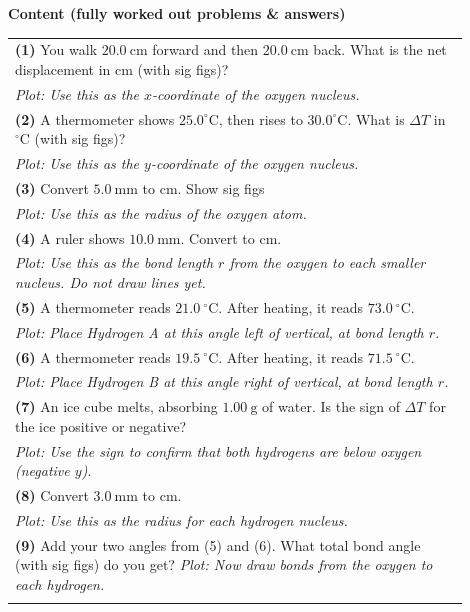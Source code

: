 \documentclass{article}
\begin{document}
\noindent
{\large \textbf{Content (fully worked out problems \& answers)}}
\\
\begin{tabular}{|p{0.9\linewidth}|}
\hline
\textbf{(1)} You walk $20.0~\text{cm}$ forward and then $20.0~\text{cm}$ back. What is the net displacement in cm (with sig figs)? \\
\textit{Plot: Use this as the $x$-coordinate of the oxygen nucleus.} \\
\textbf{(2)} A thermometer shows $25.0^\circ\text{C}$, then rises to $30.0^\circ\text{C}$. What is $\Delta T$ in $^\circ\text{C}$ (with sig figs)? \\
\textit{Plot: Use this as the $y$-coordinate of the oxygen nucleus.} \\
\textbf{(3)} Convert $5.0~\text{mm}$ to cm. Show sig figs \\
\textit{Plot: Use this as the radius of the oxygen atom.} \\
\textbf{(4)} A ruler shows $10.0~\text{mm}$. Convert to cm. \\
\textit{Plot: Use this as the bond length $r$ from the oxygen to each smaller nucleus. Do not draw lines yet.} \\
\textbf{(5)} A thermometer reads $21.0~^\circ\text{C}$. After heating, it reads $73.0~^\circ\text{C}$. \\
\textit{Plot: Place Hydrogen A at this angle left of vertical, at bond length $r$.} \\
\textbf{(6)} A thermometer reads $19.5~^\circ\text{C}$. After heating, it reads $71.5~^\circ\text{C}$. \\
\textit{Plot: Place Hydrogen B at this angle right of vertical, at bond length $r$.} \\
\textbf{(7)} An ice cube melts, absorbing $1.00~\text{g}$ of water. Is the sign of $\Delta T$ for the ice positive or negative? \\
\textit{Plot: Use the sign to confirm that both hydrogens are below oxygen (negative $y$).} \\
\textbf{(8)} Convert $3.0~\text{mm}$ to cm. \\
\textit{Plot: Use this as the radius for each hydrogen nucleus.} \\
\textbf{(9)} Add your two angles from (5) and (6). What total bond angle (with sig figs) do you get?
\textit{Plot: Now draw bonds from the oxygen to each hydrogen.} \\
\\ \hline
\end{tabular}
\end{document}
